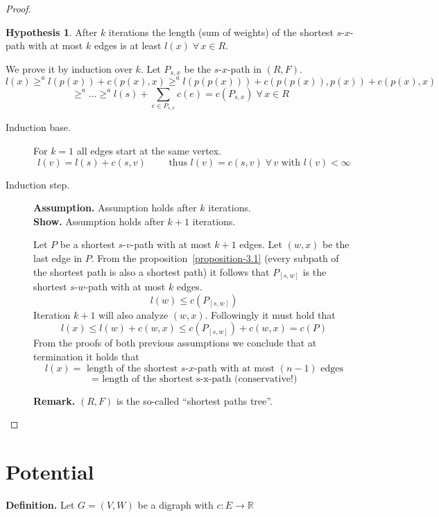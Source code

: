 \documentclass[a4paper]{article}
\theoremstyle{definition}
\newtheorem{hypothesis}[theorem]{Hypothesis}
\newcommand{\gath}[2]{$#1$-$#2$-path} %
\newcommand{\fall}{\;\forall\,}
\begin{document}
\begin{proof}
  \begin{hypothesis} %
    After $k$ iterations the length (sum of weights) of the shortest \gath sx with at most $k$ edges is at least $l(x) \fall x \in R$.
  \end{hypothesis}

  We prove it by induction over $k$. Let $P_{s,x}$ be the \gath sx in $(R, F)$.
  \[
    l(x) \geq^a l(p(x)) + c(p(x), x) \geq^a l(p(p(x))) + c(p(p(x)), p(x)) + c(p(x), x)
  \] \[
    \geq^a \ldots \geq^a l(s) + \sum_{e \in P_{s,x}} c(e) = c(P_{s,x}) \fall x \in R
  \]

  \begin{description}
    \item[Induction base.]
      For $k=1$ all edges start at the same vertex. \\
      \[
        l(v) = l(s) + c(s, v) \qquad \text{ thus } l(v) = c(s, v) \fall v \text{ with } l(v) < \infty
      \]

    \item[Induction step.]
    \textbf{Assumption.}
      Assumption holds after $k$ iterations. \\
    \textbf{Show.}
      Assumption holds after $k+1$ iterations.

    Let $P$ be a shortest \gath sv with at most $k+1$ edges. Let $(w, x)$ be the last edge in $P$. From the proposition~\ref{proposition-3.1} (every subpath of the shortest path is also a shortest path) it follows that $P_{[s,w]}$ is the shortest \gath sw with at most $k$ edges.
    \[
      l(w) \leq c(P_{[s,w]})
    \]
    Iteration $k+1$ will also analyze $(w, x)$. Followingly it must hold that
    \[
      l(x) \leq l(w) + c(w, x) \leq c(P_{[s,w]}) + c(w, x) = c(P)
    \]
    From the proofs of both previous assumptions we conclude that at termination it holds that
    \[
      l(x) = \text{ length of the shortest \gath sx with at most } (n-1) \text{ edges}
    \] \[
      = \text{ length of the shortest s-x-path (conservative!)}
    \]

    \textbf{Remark.}
      $(R, F)$ is the so-called ``shortest paths tree''.
  \end{description}
\end{proof}

\section{Potential}

\textbf{Definition.} Let $G = (V, W)$ be a digraph with $c: E \rightarrow \mathbb{R}$
\end{document}
